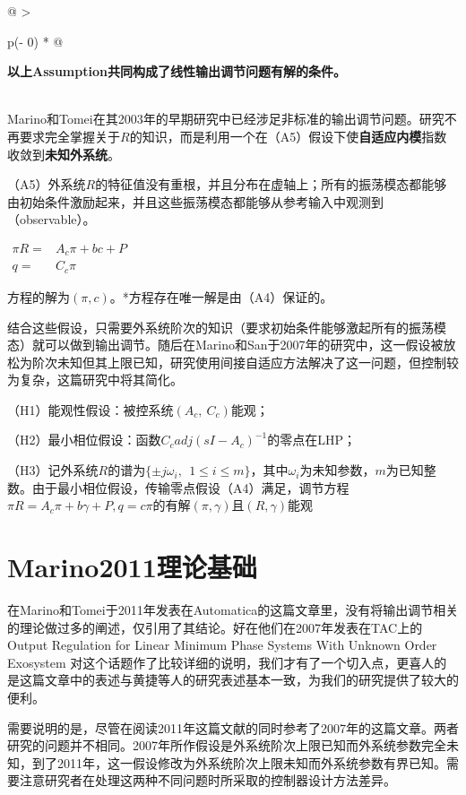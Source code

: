 \documentclass[
  12pt,
  a4paper
]{article}
\begin{document}
\begin{longtable}[]{@{}
  >{\raggedright\arraybackslash}p{}@{}}
\begin{minipage}[b]{\linewidth}
\textbf{以上Assumption共同构成了线性输出调节问题有解的条件。}
\end{minipage} \\
\midrule\noalign{}
\endhead
\bottomrule\noalign{}
\endlastfoot
Marino和Tomei在其2003年的早期研究中已经涉足非标准的输出调节问题。研究不再要求完全掌握关于\(R\)的知识，而是利用一个在（A5）假设下使\textbf{自适应内模}指数收敛到\textbf{未知外系统}。

（A5）外系统\(R\)的特征值没有重根，并且分布在虚轴上；所有的振荡模态都能够由初始条件激励起来，并且这些振荡模态都能够从参考输入中观测到（observable）。

\(\begin{aligned}
\pi R = & A_{c}\pi + bc + P \\
q = & C_{c}\pi
\end{aligned}\)

方程的解为\((\pi,c)\)。*方程存在唯一解是由（A4）保证的。

结合这些假设，只需要外系统阶次的知识（要求初始条件能够激起所有的振荡模态）就可以做到输出调节。随后在Marino和San于2007年的研究中，这一假设被放松为阶次未知但其上限已知，研究使用间接自适应方法解决了这一问题，但控制较为复杂，这篇研究中将其简化。

（H1）能观性假设：被控系统\((A_{c},\ C_{c})\)能观；

（H2）最小相位假设：函数\(C_{c}adj\left( sI - A_{c} \right)^{- 1}\)的零点在LHP；

（H3）记外系统\(R\)的谱为\(\{ \pm j\omega_{i},\ \ 1 \leq i \leq m\}\)，其中\(\omega_{i}\)为未知参数，\(m\)为已知整数。由于最小相位假设，传输零点假设（A4）满足，调节方程\(\pi R = A_{c}\pi + b\gamma + P,q = c\pi\)的有解\((\pi,\gamma)\)且\((R,\gamma)\)能观 \\
\end{longtable}

\section{Marino2011理论基础}\label{marino2011ux7406ux8bbaux57faux7840}

在Marino和Tomei于2011年发表在Automatica的这篇文章里，没有将输出调节相关的理论做过多的阐述，仅引用了其结论。好在他们在2007年发表在TAC上的Output
Regulation for Linear Minimum Phase Systems With Unknown Order Exosystem
对这个话题作了比较详细的说明，我们才有了一个切入点，更喜人的是这篇文章中的表述与黄捷等人的研究表述基本一致，为我们的研究提供了较大的便利。

需要说明的是，尽管在阅读2011年这篇文献的同时参考了2007年的这篇文章。两者研究的问题并不相同。2007年所作假设是外系统阶次上限已知而外系统参数完全未知，到了2011年，这一假设修改为外系统阶次上限未知而外系统参数有界已知。需要注意研究者在处理这两种不同问题时所采取的控制器设计方法差异。
\end{document}
